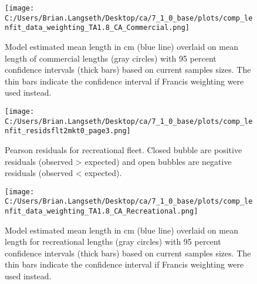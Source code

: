 \documentclass[11pt,
  english,
  letterpaper,
]{article}
\begin{document}
\tagmcend\tagstructend


\begin{figure}
\centering
\texttt{[image: C:/Users/Brian.Langseth/Desktop/ca/7\_1\_0\_base/plots/comp\_lenfit\_data\_weighting\_TA1.8\_CA\_Commercial.png]}
\caption{Model estimated mean length in cm (blue line) overlaid on mean length of commercial lengths (gray circles) with 95 percent confidence intervals (thick bars) based on current samples sizes. The thin bars indicate the confidence interval if Francis weighting were used instead.\label{fig:com-mean-len-fit}}
\end{figure}

\tagmcend\tagstructend


\begin{figure}
\centering
\texttt{[image: C:/Users/Brian.Langseth/Desktop/ca/7\_1\_0\_base/plots/comp\_lenfit\_residsflt2mkt0\_page3.png]}
\caption{Pearson residuals for recreational fleet. Closed bubble are positive residuals (observed \textgreater{} expected) and open bubbles are negative residuals (observed \textless{} expected).\label{fig:rec-pearson}}
\end{figure}

\tagmcend\tagstructend


\begin{figure}
\centering
\texttt{[image: C:/Users/Brian.Langseth/Desktop/ca/7\_1\_0\_base/plots/comp\_lenfit\_data\_weighting\_TA1.8\_CA\_Recreational.png]}
\caption{Model estimated mean length in cm (blue line) overlaid on mean length for recreational lengths (gray circles) with 95 percent confidence intervals (thick bars) based on current samples sizes. The thin bars indicate the confidence interval if Francis weighting were used instead.\label{fig:rec-mean-len-fit}}
\end{figure}
\end{document}

